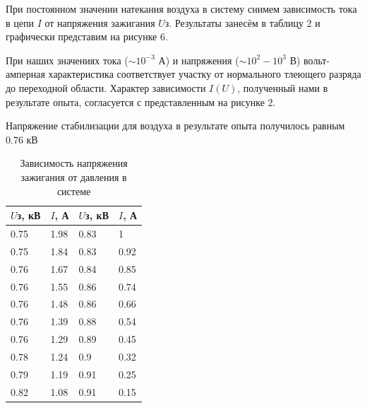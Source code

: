 \documentclass[a4paper]{article}
\begin{document}
При постоянном значении натекания воздуха в систему снимем зависимость тока в цепи $I$ от напряжения зажигания $U$з. Результаты занесём в таблицу 2 и графически представим на рисунке 6. \par

При наших значениях тока ($\sim 10^{-3}$ А) и напряжения ($\sim 10^2 - 10^3$ В) вольт-амперная характеристика соответствует участку от нормального тлеющего разряда до переходной области. Характер зависимости $I(U)$, полученный нами в результате опыта, согласуется с представленным на рисунке 2. \par
Напряжение стабилизации для воздуха в результате опыта получилось равным 0.76 кВ

\begin{table}[h]
    \centering
    \begin{center}
    \caption{Зависимость напряжения зажигания от давления в системе}
        \label{tab:my_label}
    \end{center}
   \begin{tabular}{ |p{2cm}|p{2cm}||p{2cm}| p{2cm}| }

 \hline
 $U$з, кВ & $I$, А & $U$з, кВ & $I$, А   \\
\hline
\hline

0.75 & 1.98 & 0.83 & 1 \\
\hline
0.75 & 1.84 & 0.83 & 0.92\\
\hline
0.76 & 1.67 & 0.84 & 0.85\\
\hline
0.76 & 1.55 & 0.86 & 0.74\\
\hline
0.76 & 1.48 & 0.86 & 0.66\\
\hline
0.76 & 1.39 & 0.88 & 0.54\\
\hline
0.76 & 1.29 & 0.89 & 0.45\\
\hline
0.78 & 1.24 & 0.9 & 0.32\\
\hline
0.79 & 1.19 & 0.91 & 0.25\\
\hline
0.82 & 1.08 & 0.91 & 0.15\\
 \hline
\end{tabular}

\end{table}
\end{document}
